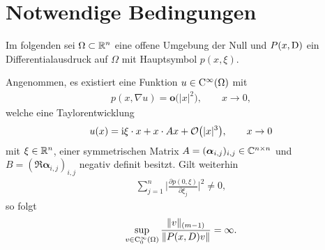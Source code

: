 \section{Notwendige Bedingungen}
Im folgenden sei $\Omega \subset \mathbb R^n$ eine offene Umgebung der Null und $P(x,\mathrm D)$ ein Differentialausdruck auf $\Omega$ mit Hauptsymbol $p(x,\xi)$. 
\begin{lem}\label{lem1}
Angenommen, es existiert eine Funktion $u \in \mathrm C^\infty (\Omega)$ mit 
\begin{align}
\label{grad}
p(x, \nabla u) = \mathbf{o} \big(|x|^2\big), \qquad  x \rightarrow 0,
\end{align}
welche eine Taylorentwicklung 
\begin{align}\label{taylor}
u(x) = \mathrm i \xi\cdot x + x\cdot A x + \mathcal O\big(|x|^3\big),\qquad x\to0
\end{align}
mit $\xi\in\mathbb R^n$, einer symmetrischen Matrix $A=(\boldsymbol\alpha_{i,j})_{i,j}\in\mathbb C^{n\times n}$ und $B = (\Re \boldsymbol\alpha_{i,j})_{i,j} $ negativ definit  besitzt. 
Gilt weiterhin  
\begin{align}
\label{normpart}
\sum_{j=1}^{n}\bigg|\frac{\partial p(0,\xi)}{\partial \xi_j}\bigg|^2 \neq 0,
\end{align}
so folgt
\begin{align}
\label{lm 1 eq}
\sup_{v\in\mathrm C_0^\infty(\Omega)} \frac{ \lVert v \rVert_{(m-1)} }{ \lVert P(x,D)v \rVert} = \infty.
\end{align}
\end{lem}
